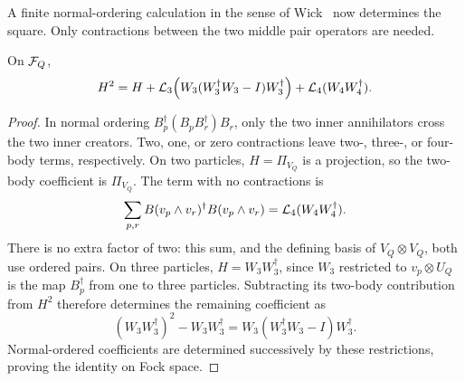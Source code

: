 A finite normal-ordering calculation in the sense of Wick~\cite{Wick}
now determines the square. Only contractions between the two middle
pair operators are needed.

\begin{lemma}\label{lem:square}
On $\mathcal F_Q$,
\begin{equation}\label{eq:square}
 H^2=H+\mathcal L_3\!\left(W_3(W_3^\dagger W_3-I)W_3^\dagger\right)
       +\mathcal L_4(W_4W_4^\dagger).
\end{equation}
\end{lemma}
\begin{proof}
In normal ordering $B_p^\dagger(B_pB_r^\dagger)B_r$, only the two inner annihilators cross the two inner creators. Two, one, or zero contractions leave two-, three-, or four-body terms, respectively. On two particles, $H=\Pi_{V_Q}$ is a projection, so the two-body coefficient is $\Pi_{V_Q}$. The term with no contractions is
\[
 \sum_{p,r}B(v_p\wedge v_r)^\dagger B(v_p\wedge v_r)
 =\mathcal L_4(W_4W_4^\dagger).
\]
There is no extra factor of two: this sum, and the defining basis of $V_Q\otimes V_Q$, both use ordered pairs. On three particles, $H=W_3W_3^\dagger$, since $W_3$ restricted to $v_p\otimes U_Q$ is the map $B_p^\dagger$ from one to three particles. Subtracting its two-body contribution from $H^2$ therefore determines the remaining coefficient as
\[
 (W_3W_3^\dagger)^2-W_3W_3^\dagger
 =W_3(W_3^\dagger W_3-I)W_3^\dagger.
\]
Normal-ordered coefficients are determined successively by these restrictions, proving the identity on Fock space.
\end{proof}
